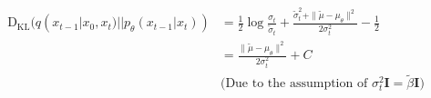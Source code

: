 \documentclass[11pt, oneside]{article}   	%
\begin{document}
\begin{align*}
	\mathrm{D}_{\mathrm{KL}}(q(x_{t-1}| x_{0}, x_{t}) || p_{\theta}(x_{t-1}|x_{t})) 
	&= \frac{1}{2} \log \frac{\sigma_{t}}{\tilde{\sigma}_{t}} + \frac{\tilde{\sigma}_{t}^2 + \parallel\tilde{\mu} - \mu_{\theta}\parallel^2}{2\sigma_{t}^2} - \frac{1}{2} \\
	&= \frac{\parallel\tilde{\mu} - \mu_{\theta}\parallel^2}{2\sigma_{t}^2} + C \\
	&\text{(Due to the assumption of $\sigma_{t}^{2}\mathbf{I} = \tilde{\beta}\mathbf{I}$)}
\end{align*}
\end{document}

